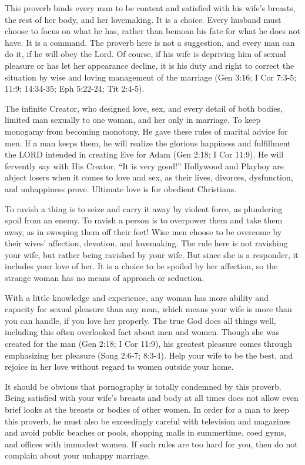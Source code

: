 This proverb binds every man to be content and satisfied with his wife’s breasts, the rest of her body, and her lovemaking. It is a choice. Every husband must choose to focus on what he has, rather than bemoan his fate for what he does not have. It is a command. The proverb here is not a suggestion, and every man can do it, if he will obey the Lord. Of course, if his wife is depriving him of sexual pleasure or has let her appearance decline, it is his duty and right to correct the situation by wise and loving management of the marriage (Gen 3:16; I Cor 7:3-5; 11:9; 14:34-35; Eph 5:22-24; Tit 2:4-5).

The infinite Creator, who designed love, sex, and every detail of both bodies, limited man sexually to one woman, and her only in marriage. To keep monogamy from becoming monotony, He gave these rules of marital advice for men. If a man keeps them, he will realize the glorious happiness and fulfillment the LORD intended in creating Eve for Adam (Gen 2:18; I Cor 11:9). He will fervently say with His Creator, “It is very good!” Hollywood and Playboy are abject losers when it comes to love and sex, as their lives, divorces, dysfunction, and unhappiness prove. Ultimate love is for obedient Christians.

To ravish a thing is to seize and carry it away by violent force, as plundering spoil from an enemy. To ravish a person is to overpower them and take them away, as in sweeping them off their feet! Wise men choose to be overcome by their wives’ affection, devotion, and lovemaking. The rule here is not ravishing your wife, but rather being ravished by your wife. But since she is a responder, it includes your love of her. It is a choice to be spoiled by her affection, so the strange woman has no means of approach or seduction.

With a little knowledge and experience, any woman has more ability and capacity for sexual pleasure than any man, which means your wife is more than you can handle, if you love her properly. The true God does all things well, including this often overlooked fact about men and women. Though she was created for the man (Gen 2:18; I Cor 11:9), his greatest pleasure comes through emphasizing her pleasure (Song 2:6-7; 8:3-4). Help your wife to be the best, and rejoice in her love without regard to women outside your home.

It should be obvious that pornography is totally condemned by this proverb. Being satisfied with your wife’s breasts and body at all times does not allow even brief looks at the breasts or bodies of other women. In order for a man to keep this proverb, he must also be exceedingly careful with television and magazines and avoid public beaches or pools, shopping malls in summertime, coed gyms, and offices with immodest women. If such rules are too hard for you, then do not complain about your unhappy marriage.

